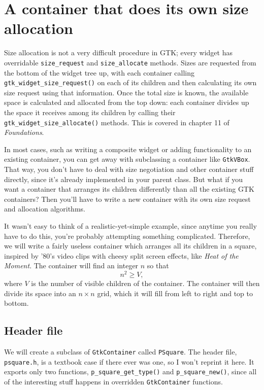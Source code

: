 \documentclass[%
			   halfparskip,smallheadings,pointlessnumbers]%
			   {scrartcl} %
\begin{document}
\section{A container that does its own size allocation}

Size allocation is not a very difficult procedure in GTK; every widget has overridable \lstinline$size_request$ and \lstinline$size_allocate$ methods. Sizes are requested from the bottom of the widget tree up, with each container calling \lstinline$gtk_widget_size_request()$ on each of its children and then calculating its own size request using that information. Once the total size is known, the available space is calculated and allocated from the top down: each container divides up the space it receives among its children by calling their \lstinline$gtk_widget_size_allocate()$ methods. This is covered in chapter 11 of \emph{Foundations}.

In most cases, such as writing a composite widget or adding functionality to an existing container, you can get away with subclassing a container like \lstinline$GtkVBox$. That way, you don't have to deal with size negotiation and other container stuff directly, since it's already implemented in your parent class. But what if you want a container that arranges its children differently than all the existing GTK containers? Then you'll have to write a new container with its own size request and allocation algorithms.

It wasn't easy to think of a realistic-yet-simple example, since anytime you really have to do this, you're probably attempting something complicated. Therefore, we will write a fairly useless container which arranges all its children in a square, inspired by '80's video clips with cheesy split screen effects, like \emph{Heat of the Moment}. The container will find an integer $n$ so that 
\[ n^2 \geq V, \]
where $V$ is the number of visible children of the container. The container will then divide its space into an $n \times n$ grid, which it will fill from left to right and top to bottom.

\subsection{Header file}

We will create a subclass of \lstinline$GtkContainer$ called \lstinline$PSquare$. The header file, \texttt{psquare.h}, is a textbook case if there ever was one, so I won't reprint it here. It exports only two functions, \lstinline$p_square_get_type()$ and \lstinline$p_square_new()$, since all of the interesting stuff happens in overridden \lstinline$GtkContainer$ functions.
\end{document}
